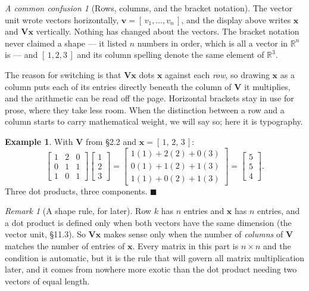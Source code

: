 \documentclass[11pt]{article}
\theoremstyle{plain}
\theoremstyle{definition}
\newtheorem{ex}{Example}[section]
\theoremstyle{remark}
\newtheorem*{rmk}{Remark}
\newtheorem*{warn}{A common confusion}
\newcommand{\R}{\mathbb{R}}
\newcommand{\vc}[1]{\mathbf{#1}}        %
\newcommand{\mt}[1]{\mathbf{#1}}        %
\begin{document}
\begin{warn}[Rows, columns, and the bracket notation]
The vector unit wrote vectors horizontally, $\vc{v}=[\,v_1,\dots,v_n\,]$, and
the display above writes $\vc{x}$ and $\mt{V}\vc{x}$ vertically. Nothing has
changed about the vectors. The bracket notation never claimed a shape --- it
listed $n$ numbers in order, which is all a vector in $\R^{n}$ is --- and
$[\,1,2,3\,]$ and its column spelling denote the same element of $\R^{3}$.

The reason for switching is that $\mt{V}\vc{x}$ dots $\vc{x}$ against each
\emph{row}, so drawing $\vc{x}$ as a column puts each of its entries directly
beneath the column of $\mt{V}$ it multiplies, and the arithmetic can be read off
the page. Horizontal brackets stay in use for prose, where they take less room.
When the distinction between a row and a column starts to carry mathematical
weight, we will say so; here it is typography.
\end{warn}

\begin{ex}
With $\mt{V}$ from \S2.2 and $\vc{x}=[\,1,\,2,\,3\,]$:
\[
  \begin{bmatrix}
    1 & 2 & 0 \\
    0 & 1 & 1 \\
    1 & 0 & 1
  \end{bmatrix}
  \begin{bmatrix} 1 \\ 2 \\ 3 \end{bmatrix}
  =
  \begin{bmatrix}
    1(1) + 2(2) + 0(3) \\
    0(1) + 1(2) + 1(3) \\
    1(1) + 0(2) + 1(3)
  \end{bmatrix}
  =
  \begin{bmatrix} 5 \\ 5 \\ 4 \end{bmatrix} .
\]
Three dot products, three components. \hfill$\blacksquare$
\end{ex}

\begin{rmk}[A shape rule, for later]
Row $k$ has $n$ entries and $\vc{x}$ has $n$ entries, and a dot product is
defined only when both vectors have the same dimension (the vector unit,
\S11.3). So $\mt{V}\vc{x}$ makes sense only when the number of \emph{columns} of
$\mt{V}$ matches the number of entries of $\vc{x}$. Every matrix in this part is
$n\times n$ and the condition is automatic, but it is the rule that will govern
all matrix multiplication later, and it comes from nowhere more exotic than the
dot product needing two vectors of equal length.
\end{rmk}
\end{document}
